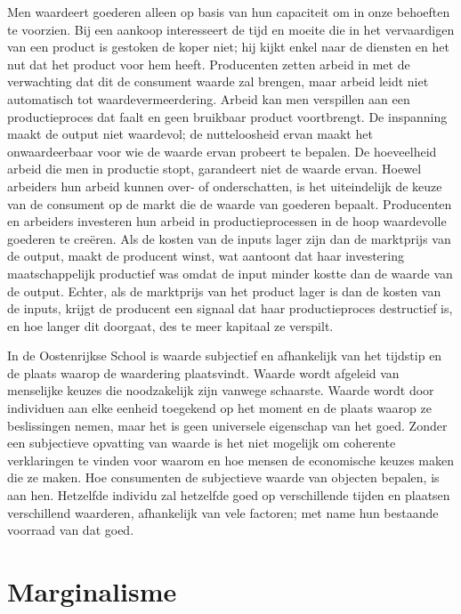 Men waardeert goederen alleen op basis van hun capaciteit om in onze behoeften te voorzien. Bij een aankoop interesseert de tijd en moeite die in het vervaardigen van een product is gestoken de koper niet; hij kijkt enkel naar de diensten en het nut dat het product voor hem heeft. Producenten zetten arbeid in met de verwachting dat dit de consument waarde zal brengen, maar arbeid leidt niet automatisch tot waardevermeerdering. Arbeid kan men verspillen aan een productieproces dat faalt en geen bruikbaar product voortbrengt. De inspanning maakt de output niet waardevol; de nutteloosheid ervan maakt het onwaardeerbaar voor wie de waarde ervan probeert te bepalen. De hoeveelheid arbeid die men in productie stopt, garandeert niet de waarde ervan. Hoewel arbeiders hun arbeid kunnen over- of onderschatten, is het uiteindelijk de keuze van de consument op de markt die de waarde van goederen bepaalt. Producenten en arbeiders investeren hun arbeid in productieprocessen in de hoop waardevolle goederen te creëren. Als de kosten van de inputs lager zijn dan de marktprijs van de output, maakt de producent winst, wat aantoont dat haar investering maatschappelijk productief was omdat de input minder kostte dan de waarde van de output. Echter, als de marktprijs van het product lager is dan de kosten van de inputs, krijgt de producent een signaal dat haar productieproces destructief is, en hoe langer dit doorgaat, des te meer kapitaal ze verspilt.

In de Oostenrijkse School is waarde subjectief en afhankelijk van het tijdstip en de plaats waarop de waardering plaatsvindt. Waarde wordt afgeleid van menselijke keuzes die noodzakelijk zijn vanwege schaarste. Waarde wordt door individuen aan elke eenheid toegekend op het moment en de plaats waarop ze beslissingen nemen, maar het is geen universele eigenschap van het goed. Zonder een subjectieve opvatting van waarde is het niet mogelijk om coherente verklaringen te vinden voor waarom en hoe mensen de economische keuzes maken die ze maken. Hoe consumenten de subjectieve waarde van objecten bepalen, is aan hen. Hetzelfde individu zal hetzelfde goed op verschillende tijden en plaatsen verschillend waarderen, afhankelijk van vele factoren; met name hun bestaande voorraad van dat goed.

\section{Marginalisme}

